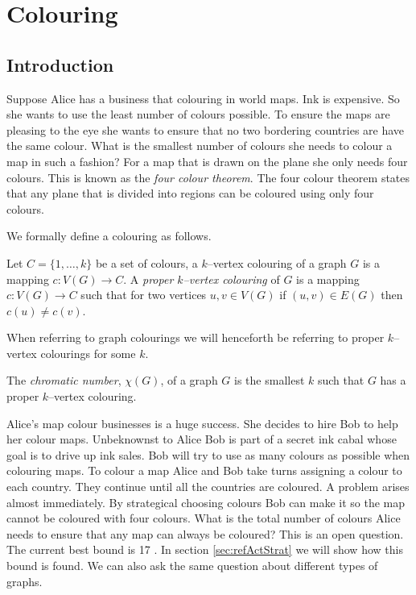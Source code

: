 \chapter{Colouring}

\section{Introduction}

Suppose Alice has a business that colouring in world maps. Ink is expensive. So she wants to use the least number of colours possible. To ensure the maps are pleasing to the eye she wants to ensure that no two bordering countries are have the same colour. What is the smallest number of colours she needs to colour a map in such a fashion? For a map that is drawn on the plane she only needs four colours. This is known as the \textit{four colour theorem}. The four colour theorem states that any plane that is divided into regions can be coloured using only four colours. 

We formally define a colouring as follows.
\begin{definition}
Let $C=\{1,\dots,k\}$ be a set of colours, a $k$--vertex colouring of a graph $G$ is a mapping $c\colon V(G) \to C$. A \textit{proper $k$--vertex colouring} of $G$ is a mapping $c\colon V(G) \to C$ such that for two vertices $u,v\in V(G)$ if $(u,v)\in E(G)$ then $c(u)\neq c(v)$. 
\end{definition}
When referring to graph colourings we will henceforth be referring to proper $k$--vertex colourings for some $k$. 
\begin{definition}
The \textit{chromatic number}, $\chi(G)$, of a graph $G$ is the smallest $k$ such that $G$ has a proper $k$--vertex colouring.
\end{definition} 

Alice's map colour businesses is a huge success. She decides to hire Bob to help her colour maps. Unbeknownst to Alice Bob is part of a secret ink cabal whose goal is to drive up ink sales. Bob will try to use as many colours as possible when colouring maps. To colour a map Alice and Bob take turns assigning a colour to each country. They continue until all the countries are coloured. A problem arises almost immediately. By strategical choosing colours Bob can make it so the map cannot be coloured with four colours. What is the total number of colours Alice needs to ensure that any map can always be coloured? This is an open question. The current best bound is 17 \cite{Zhu2008}. In section \ref{sec:refActStrat} we will show how this bound is found. We can also ask the same question about different types of graphs. 

